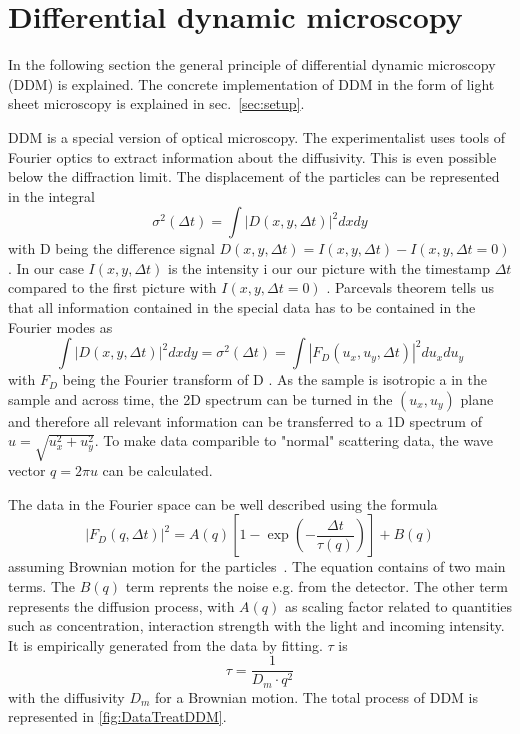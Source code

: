 \section{Differential dynamic microscopy}
\label{sec:DDM}

In the following section the general principle of differential dynamic microscopy (DDM) is explained. The concrete implementation of DDM
in the form of light sheet microscopy is explained in sec.~\ref{sec:setup}.

DDM is a special version of optical microscopy. The experimentalist uses tools of Fourier optics to extract information about the 
diffusivity. This is even possible below the diffraction limit. The displacement of the particles can be represented in the integral 
\begin{equation}
    \sigma^2(\Delta t) = \int |D(x,y,\Delta t)|^2 dx dy
\end{equation}
with D being the difference signal $D(x,y,\Delta t) = I(x,y,\Delta t) -I(x,y,\Delta t =0)$. In our case $I(x,y,\Delta t)$ is the intensity i our our 
picture with the timestamp $\Delta t $ compared to the first picture with $I(x,y,\Delta t = 0)$ \cite{Cerbino.2008}. Parcevals theorem tells us that all information
contained in the special data has to be contained in the Fourier modes as 
\begin{equation}
    \int |D(x,y,\Delta t)|^2 dx dy = \sigma^2(\Delta t) = \int |F_D(u_x,u_y,\Delta t)|^2 du_x du_y
\end{equation}
with $F_D$ being the Fourier transform of D \cite{Butz.2012}. As the sample is isotropic a in the sample and across time, the 2D spectrum 
can be turned in the $(u_x, u_y)$ plane and therefore all relevant information can be transferred to a 1D spectrum of $u = \sqrt{u_x^2+u_y^2}$. To make data comparible to 
"normal" scattering data, the wave vector $q = 2\pi u$ can be calculated. 

The data in the Fourier space can be well described using the formula
\begin{equation}
    |F_D(q,\Delta t)|^2 = A(q)[1- \exp(-\frac{\Delta t}{\tau (q)})] +B(q)
    \label{eq:21.3}
\end{equation}
assuming Brownian motion for the particles~\cite{Berne.2013}. The equation contains of two main terms. The $B(q)$ term reprents the 
noise e.g. from the detector. The other term represents the diffusion process, with $A(q)$ as scaling factor related to quantities such as concentration, 
interaction strength with the light and incoming intensity. It is empirically generated from the data by fitting. $\tau$ is 
\begin{equation}
    \tau = \frac{1}{D_m \cdot q^2}
    \label{eq:21.4}
\end{equation} 
with the diffusivity $D_m$ for a Brownian motion. The total process of DDM is represented in \cref{fig:DataTreatDDM}.


